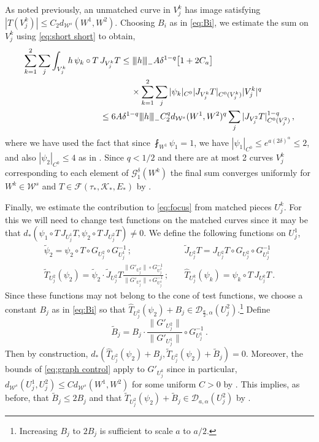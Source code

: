 \documentclass{amsart}
\numberwithin{equation}{section}
\newcommand\cD{{\mathcal D}}
\newcommand\cF{{\mathcal F}}
\newcommand\cG{{\mathcal G}}
\newcommand\cK{{\mathcal K}}
\newcommand\cW{{\mathcal W}}
\newcommand\tpsi{\tilde{\psi}}
\newcommand\tJ{\widetilde{J}}
\newcommand\tT{\widetilde{T}}
\newcommand{\tri}{{|\:\!\!|\:\!\!|}}
\newcommand{\hT}{\widehat{T}}
\begin{document}
As noted previously, an unmatched curve in $V^k_j$ has image satisfying
$|T(V^k_j)| \le C_2 d_{\cW^s}(W^1, W^2)$.  
Choosing $B_i$ as in \eqref{eq:Bi}, we estimate the sum on $V^k_j$ using \eqref{eq:short short} to obtain,
\begin{equation}
\label{eq:cone 3 unmatched}
\begin{split}
\sum_{k=1}^2 \sum_j \int_{V^k_j} h \, \psi_k \circ T \, J_{V^k_j}T
& \le \tri h \tri_- A \delta^{1-q} \big[ 1 + 2C_a \big] \\
&\hskip12pt \times\sum_{k=1}^2 \sum_j 
|\psi_k|_{C^0} |J_{V^k_j}T|_{C^0(V^k_j)} |V^k_j|^q \\
&\hskip-24pt \le 
6 A \delta^{1-q} \tri h \tri_- C_2^q d_{\cW^s}(W^1, W^2)^q \sum_j |J_{V^2_j}T|^{1-q}_{C^0(V^2_j)} \, ,
\end{split}
\end{equation}
where we have used the fact that since $\fint_{W^1} \psi_1 = 1$, we have $|\psi_1|_{C^0} \le e^{a(2\delta)^\alpha} \le 2$, 
and also $|\psi_2 |_{C^0} \le 4$ as in  \cite[eq.~(5.9)]{DL22}.
Since $q<1/2$ and there are at most 2 curves $V^k_j$ corresponding
to each element of $\cG_1^\delta(W^k)$ the final sum converges uniformly for $W^k \in \cW^s$ 
and $T \in \cF(\tau_*, \cK_*, E_*)$
by \cite[Lemma~3.4]{DZ11}.

Finally, we estimate the contribution to \eqref{eq:focus} from matched pieces $U^k_j$.
For this we will need to change test functions on the matched curves since it may be
that $d_*(\psi_1\circ T \, J_{U^1_j}T, \psi_2 \circ T \, J_{U^2_j}T) \ne 0$.  We define
the following functions on $U^1_j$,
\[
\begin{split}
\tpsi_2 = \psi_2 \circ T \circ G_{U^2_j} \circ G_{U^1_j}^{-1} \, ;
& \quad \tJ_{U^2_j}T = J_{U^2_j}T \circ G_{U^2_j} \circ G_{U^1_j}^{-1} \\
\tT_{U^2_j}(\psi_2) = \tpsi_2 \cdot \tJ_{U^2_j}T \frac{\| G'_{U^2_j} \| \circ G_{U^1_j}^{-1} }
{\| G'_{U^1_j} \| \circ G_{U^1_j}^{-1} } \, ;
& \quad \hT_{U^k_j}(\psi_k) = \psi_k \circ T \, J_{U^k_j}T \, .
\end{split}
\]
Since these functions may not belong to the cone of test functions, we choose a constant
$B_j$ as in \eqref{eq:Bi} so that 
$\hT_{U^2_j}(\psi_2) + B_j \in \cD_{\frac{a}{2},\alpha}(U^2_j)$.\footnote{Increasing
$B_j$ to $2B_j$ is sufficient to scale $a$ to $a/2$.}  Define
\[
\tilde B_j = B_j \cdot \frac{\| G'_{U^2_j} \|} 
{\| G'_{U^1_j} \| } \circ G_{U^1_j}^{-1}  \, .
\]
Then by construction, $d_*(\hT_{U^2_j}(\psi_2) + B_j, \tT_{U^2_j}(\psi_2) + \tilde B_j) = 0$. 
Moreover, the bounds of \eqref{eq:graph control} apply to $G'_{U^k_j}$ since in particular,
$d_{\cW^s}(U^1_j, U^2_j) \le C d_{\cW^s}(W^1, W^2)$ 
for some uniform $C>0$ by \cite[Lemma~3.3]{DZ13}.  This implies, as before, that
$\tilde B_j \le 2 B_j$ and that
$\tT_{U^2_j}(\psi_2) + \tilde B_j \in \cD_{a, \alpha}(U^2_j)$
by \cite[eq.~(5.31)]{DL22}.
\end{document}
